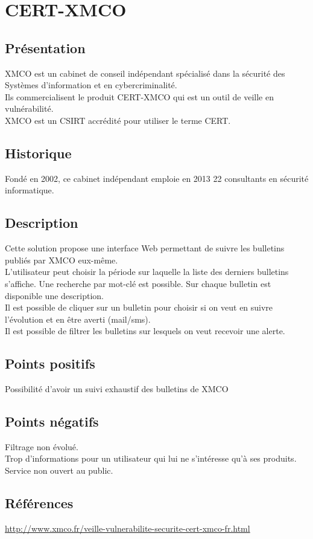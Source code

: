 \section{CERT-XMCO}
\thispagestyle{plain}
\subsection{Présentation}
XMCO est un cabinet de conseil indépendant spécialisé dans la sécurité des Systèmes d’information et en cybercriminalité.\\
Ils commercialisent le produit CERT-XMCO qui est un outil de veille en vulnérabilité.\\
XMCO est un CSIRT accrédité pour utiliser le terme CERT.\\

\subsection{Historique}
Fondé en 2002, ce cabinet indépendant emploie en 2013 22 consultants en sécurité informatique.

\subsection{Description}
Cette solution propose une interface Web permettant de suivre les bulletins publiés par XMCO eux-même.\\
L’utilisateur peut choisir la période sur laquelle la liste des derniers bulletins s’affiche. Une recherche par mot-clé est possible. Sur chaque bulletin est disponible une description.\\
Il est possible de cliquer sur un bulletin pour choisir si on veut en suivre l’évolution et en être averti (mail/sms).\\
Il est possible de filtrer les bulletins sur lesquels on veut recevoir une alerte.\\

\subsection{Points positifs}
Possibilité d’avoir un suivi exhaustif des bulletins de XMCO

\subsection{Points négatifs}
Filtrage non évolué.\\
Trop d’informations pour un utilisateur qui lui ne s’intéresse qu’à ses produits.\\
Service non ouvert au public.\\

\subsection{Références}
\small
\noindent
\url{http://www.xmco.fr/veille-vulnerabilite-securite-cert-xmco-fr.html}
\normalsize
